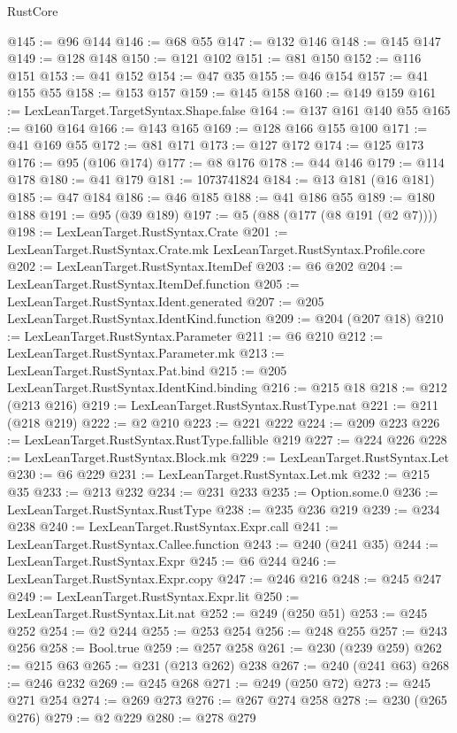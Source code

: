 \begin{lexlean}{RustCore}
\begin{coremodule}
@145 := @96 @144
@146 := @68 @55
@147 := @132 @146
@148 := @145 @147
@149 := @128 @148
@150 := @121 @102
@151 := @81 @150
@152 := @116 @151
@153 := @41 @152
@154 := @47 @35
@155 := @46 @154
@157 := @41 @155 @55
@158 := @153 @157
@159 := @145 @158
@160 := @149 @159
@161 := LexLeanTarget.TargetSyntax.Shape.false
@164 := @137 @161 @140 @55
@165 := @160 @164
@166 := @143 @165
@169 := @128 @166 @155 @100
@171 := @41 @169 @55
@172 := @81 @171
@173 := @127 @172
@174 := @125 @173
@176 := @95 (@106 @174)
@177 := @8 @176
@178 := @44 @146
@179 := @114 @178
@180 := @41 @179
@181 := 1073741824
@184 := @13 @181 (@16 @181)
@185 := @47 @184
@186 := @46 @185
@188 := @41 @186 @55
@189 := @180 @188
@191 := @95 (@39 @189)
@197 := @5 (@88 (@177 (@8 @191 (@2 @7))))
@198 := LexLeanTarget.RustSyntax.Crate
@201 := LexLeanTarget.RustSyntax.Crate.mk LexLeanTarget.RustSyntax.Profile.core
@202 := LexLeanTarget.RustSyntax.ItemDef
@203 := @6 @202
@204 := LexLeanTarget.RustSyntax.ItemDef.function
@205 := LexLeanTarget.RustSyntax.Ident.generated
@207 := @205 LexLeanTarget.RustSyntax.IdentKind.function
@209 := @204 (@207 @18)
@210 := LexLeanTarget.RustSyntax.Parameter
@211 := @6 @210
@212 := LexLeanTarget.RustSyntax.Parameter.mk
@213 := LexLeanTarget.RustSyntax.Pat.bind
@215 := @205 LexLeanTarget.RustSyntax.IdentKind.binding
@216 := @215 @18
@218 := @212 (@213 @216)
@219 := LexLeanTarget.RustSyntax.RustType.nat
@221 := @211 (@218 @219)
@222 := @2 @210
@223 := @221 @222
@224 := @209 @223
@226 := LexLeanTarget.RustSyntax.RustType.fallible @219
@227 := @224 @226
@228 := LexLeanTarget.RustSyntax.Block.mk
@229 := LexLeanTarget.RustSyntax.Let
@230 := @6 @229
@231 := LexLeanTarget.RustSyntax.Let.mk
@232 := @215 @35
@233 := @213 @232
@234 := @231 @233
@235 := Option.some.{0}
@236 := LexLeanTarget.RustSyntax.RustType
@238 := @235 @236 @219
@239 := @234 @238
@240 := LexLeanTarget.RustSyntax.Expr.call
@241 := LexLeanTarget.RustSyntax.Callee.function
@243 := @240 (@241 @35)
@244 := LexLeanTarget.RustSyntax.Expr
@245 := @6 @244
@246 := LexLeanTarget.RustSyntax.Expr.copy
@247 := @246 @216
@248 := @245 @247
@249 := LexLeanTarget.RustSyntax.Expr.lit
@250 := LexLeanTarget.RustSyntax.Lit.nat
@252 := @249 (@250 @51)
@253 := @245 @252
@254 := @2 @244
@255 := @253 @254
@256 := @248 @255
@257 := @243 @256
@258 := Bool.true
@259 := @257 @258
@261 := @230 (@239 @259)
@262 := @215 @63
@265 := @231 (@213 @262) @238
@267 := @240 (@241 @63)
@268 := @246 @232
@269 := @245 @268
@271 := @249 (@250 @72)
@273 := @245 @271 @254
@274 := @269 @273
@276 := @267 @274 @258
@278 := @230 (@265 @276)
@279 := @2 @229
@280 := @278 @279

\end{coremodule}
\end{lexlean}
